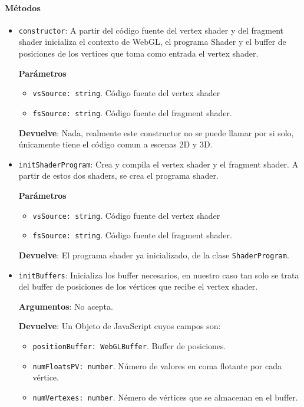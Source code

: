 \paragraph*{Métodos}
\begin{itemize}
    \item \verb|constructor|: A partir del código fuente del vertex shader y del fragment shader inicializa el contexto de WebGL, el programa Shader y el buffer de posiciones de los vertices que toma como entrada el vertex shader.
    
    \textbf{Parámetros}
    \begin{itemize}
        \item \verb|vsSource: string|. Código fuente del vertex shader
        \item \verb|fsSource: string|. Código fuente del fragment shader.
    \end{itemize}
    
    \textbf{Devuelve}: Nada, realmente este constructor no se puede llamar por si solo, únicamente tiene el código comun a escenas 2D y 3D.
    
    \item \verb|initShaderProgram|: Crea y compila el vertex shader y el fragment shader. A partir de estos dos shaders, se crea el programa shader.
    
    \textbf{Parámetros}
    \begin{itemize}
        \item \verb|vsSource: string|. Código fuente del vertex shader
        \item \verb|fsSource: string|. Código fuente del fragment shader.
    \end{itemize}
    
    \textbf{Devuelve}: El programa shader ya inicializado, de la clase \verb|ShaderProgram|.

    \item \verb|initBuffers|: Inicializa los buffer necesarios, en nuestro caso tan solo se trata del buffer de posiciones de los vértices que recibe el vertex shader.
    
    \textbf{Argumentos}: No acepta.
    
    \textbf{Devuelve}: Un Objeto de JavaScript cuyos campos son:
    \begin{itemize}
        \item \verb|positionBuffer: WebGLBuffer|. Buffer de posiciones.
        \item \verb|numFloatsPV: number|. Número de valores en coma flotante por cada vértice.
        \item \verb|numVertexes: number|. Némero de vértices que se almacenan en el buffer.
    \end{itemize}


\end{itemize}
